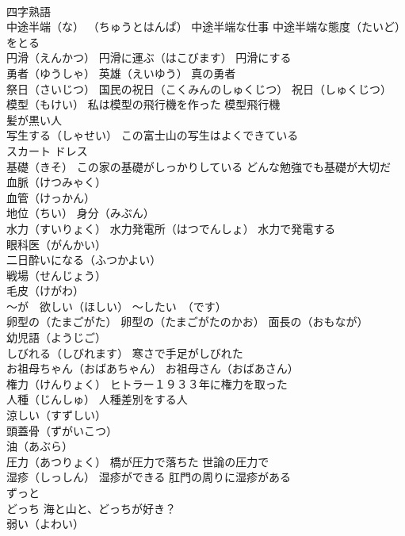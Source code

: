 \documentclass[8pt]{extreport}
\begin{document}
\begin{CJK}{UTF8}{min}
\\	四字熟語 
\\	中途半端（な） （ちゅうとはんぱ） 中途半端な仕事 中途半端な態度（たいど）をとる
\\	円滑（えんかつ） 円滑に運ぶ（はこびます） 円滑にする
\\	勇者（ゆうしゃ） 英雄（えいゆう） 真の勇者
\\	祭日（さいじつ） 国民の祝日（こくみんのしゅくじつ） 祝日（しゅくじつ）
\\	模型（もけい） 私は模型の飛行機を作った 模型飛行機
\\	髪が黒い人
\\	写生する（しゃせい） この富士山の写生はよくできている
\\	スカート ドレス
\\	基礎（きそ） この家の基礎がしっかりしている どんな勉強でも基礎が大切だ
\\	血脈（けつみゃく） 
\\	血管（けっかん）
\\	地位（ちい） 身分（みぶん）
\\	水力（すいりょく） 水力発電所（はつでんしょ） 水力で発電する
\\	眼科医（がんかい）
\\	二日酔いになる（ふつかよい）
\\	戦場（せんじょう）
\\	毛皮（けがわ）
\\	～が　欲しい（ほしい） ～したい　（です）
\\	卵型の（たまごがた） 卵型の（たまごがたのかお） 面長の（おもなが）
\\	幼児語（ようじご）
\\	しびれる（しびれます） 寒さで手足がしびれた
\\	お祖母ちゃん（おばあちゃん） お祖母さん（おばあさん）
\\	権力（けんりょく） ヒトラー１９３３年に権力を取った
\\	人種（じんしゅ） 人種差別をする人
\\	涼しい（すずしい）
\\	頭蓋骨（ずがいこつ）
\\	油（あぶら）
\\	圧力（あつりょく） 橋が圧力で落ちた 世論の圧力で
\\	湿疹（しっしん） 湿疹ができる 肛門の周りに湿疹がある
\\	ずっと
\\	どっち 海と山と、どっちが好き？
\\	弱い（よわい）

\end{CJK}
\end{document}
